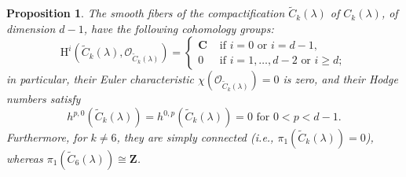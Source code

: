 \documentclass[12pt,reqno]{amsart}
\theoremstyle{definition}
\theoremstyle{plain}
\newtheorem{proposition}[theorem]{Proposition}
\theoremstyle{definition}
\newcommand{\Z}{\mathbf{Z}}
\newcommand{\Cc}{\mathbf{C}}
\renewcommand{\geq}{\geqslant}
\begin{document}
\begin{proposition} \label{cohCk} The smooth fibers of the compactification $\widetilde C_k(\lambda)$ of $C_k(\lambda)$, of dimension $d-1$, have the following cohomology groups: 
$$ \mathrm H^i(\widetilde C_k(\lambda), \mathcal O_{\widetilde C_k(\lambda)}) =  \left\{ \begin{array}{ll} \Cc  & \mbox{ if } i=0 \mbox{ or } i=d-1, \\ 0 & \mbox{ if } i=1,\dots,d-2 \mbox{ or } i\geq d; \end{array} \right.$$
in particular, their Euler characteristic $\chi(\mathcal O_{\widetilde C_k(\lambda)})=0$ is zero, and their  Hodge numbers satisfy $$h^{p,0}(\widetilde C_k(\lambda))=h^{0,p}(\widetilde C_k(\lambda))=0 \mbox{ for } 0<p<d-1.$$ Furthermore, for $k \neq 6$, they are simply connected \textup{(}i.e., $\pi_1(\widetilde C_k(\lambda))=0$\textup{)}, whereas $\pi_1(\widetilde C_6(\lambda)) \cong \Z$. 
\end{proposition} 
\end{document}
